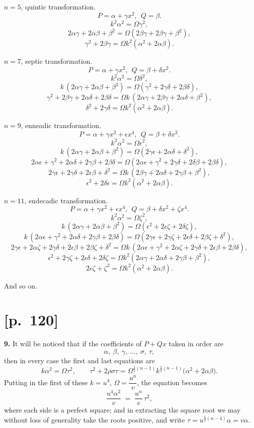 \documentclass[11pt]{article}
\begin{document}
\medskip
$n=5$, quintic transformation.
\[
P=\alpha+\gamma x^2,\ \ Q=\beta.
\]
\[
k^2\alpha^2 = \Omega\gamma^2,
\]
\[
2\alpha\gamma + 2\alpha\beta + \beta^2 = \Omega(2\beta\gamma + 2\beta\gamma + \beta^2),
\]
\[
\gamma^2 + 2\beta\gamma = \Omega k^2(\alpha^2 + 2\alpha\beta).
\]

\medskip
$n=7$, septic transformation.
\[
P=\alpha+\gamma x^2,\ \ Q=\beta+\delta x^2.
\]
\[
k^2\alpha^2 = \Omega\delta^2,
\]
\[
k\,(2\alpha\gamma + 2\alpha\beta + \beta^2) = \Omega(\gamma^2 + 2\gamma\delta + 2\beta\delta),
\]
\[
\gamma^2 + 2\beta\gamma + 2\alpha\delta + 2\beta\delta
= \Omega k\,(2\alpha\gamma + 2\beta\gamma + 2\alpha\delta + \beta^2),
\]
\[
\delta^2 + 2\gamma\delta = \Omega k^2(\alpha^2 + 2\alpha\beta).
\]

\medskip
$n=9$, enneadic transformation.
\[
P=\alpha+\gamma x^2 + \epsilon x^4,\ \ Q=\beta+\delta x^2.
\]
\[
k^2\alpha^2 = \Omega\epsilon^2,
\]
\[
k\,(2\alpha\gamma + 2\alpha\beta + \beta^2)
= \Omega(2\gamma\epsilon + 2\alpha\delta + \delta^2),
\]
\[
2\alpha\epsilon + \gamma^2 + 2\alpha\delta + 2\gamma\beta + 2\beta\delta
= \Omega(2\alpha\epsilon + \gamma^2 + 2\gamma\delta + 2\delta\beta + 2\beta\delta),
\]
\[
2\gamma\epsilon + 2\gamma\delta + 2\epsilon\beta + \delta^2
= \Omega k\,(2\beta\gamma + 2\alpha\delta + 2\gamma\beta + \beta^2),
\]
\[
\epsilon^2 + 2\delta\epsilon = \Omega k^2(\alpha^2 + 2\alpha\beta).
\]

\medskip
$n=11$, endecadic transformation.
\[
P=\alpha+\gamma x^2 + \epsilon x^4,\ \ Q=\beta+\delta x^2 + \zeta x^4.
\]
\[
k^2\alpha^2 = \Omega\zeta^2,
\]
\[
k\,(2\alpha\gamma + 2\alpha\beta + \beta^2)
= \Omega(\epsilon^2 + 2\epsilon\zeta + 2\delta\zeta),
\]
\[
k\,(2\alpha\epsilon + \gamma^2 + 2\alpha\delta + 2\gamma\beta + 2\beta\delta)
= \Omega(2\gamma\epsilon + 2\gamma\zeta + 2\epsilon\delta + 2\beta\zeta + \delta^2),
\]
\[
2\gamma\epsilon + 2\alpha\zeta + 2\gamma\delta + 2\epsilon\beta + 2\beta\zeta + \delta^2
= \Omega k\,(2\alpha\epsilon + \gamma^2 + 2\alpha\zeta + 2\gamma\delta + 2\epsilon\beta + 2\beta\delta),
\]
\[
\epsilon^2 + 2\gamma\zeta + 2\epsilon\delta + 2\delta\zeta
= \Omega k^2(2\alpha\gamma + 2\alpha\delta + 2\gamma\beta + \beta^2),
\]
\[
2\epsilon\zeta + \zeta^2 = \Omega k^2(\alpha^2 + 2\alpha\beta).
\]

And so on.

\section*{[p.~120]}

\textbf{9.} It will be noticed that if the coefficients of $P+Qx$ taken in
order are
\[
\alpha,\ \beta,\ \gamma,\ \ldots,\ \sigma,\ \tau,
\]
then in every case the first and last equations are
\[
k\alpha^2 = \Omega\tau^2,\qquad
\tau^2 + 2\rho\sigma\tau = \Omega^{\frac{1}{2}(n-1)} k^{\frac{1}{2}(n-1)}\!\bigl(\alpha^2 + 2\alpha\beta\bigr).
\]
Putting in the first of these $k=u^4$, $\Omega=\dfrac{u^n}{v}$, the
equation becomes
\[
\frac{u^4\alpha^2}{v} \;=\; \frac{u^n}{v}\,\tau^2,
\]
where each side is a perfect square; and in extracting the square root we
may without loss of generality take the roots positive, and write
$\tau = u^{\frac{1}{2}(n-4)}\alpha = v\alpha$.
\end{document}
